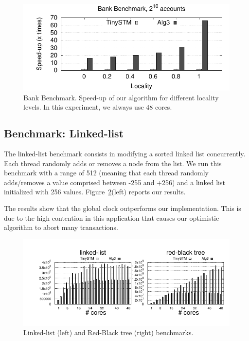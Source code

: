 \begin{figure}[!t]
	\centering
	\includegraphics[scale = 0.8]{results/bank-speedup/bank-speedup.pdf}
	\caption{Bank Benchmark. Speed-up of our algorithm for different locality levels. In this experiment, we always use 48 cores.\label{fig:benchmarking:bank:speedup}}
\end{figure}


\subsection{Benchmark: Linked-list}

The linked-list benchmark consists in modifying a sorted linked list concurrently. 
Each thread randomly adds or removes a node from the list. 
We run this benchmark with a range of 512 (meaning that each thread randomly adds/removes a value comprised between -255 and +256) and a linked list initialized with 256 values.
Figure~\ref{fig:benchmarking:llrb}(left) reports our results.

The results show that the global clock outperforms our implementation. 
This is due to the high contention in this application that causes our optimistic algorithm to abort  many transactions.

\begin{figure}[!t]
	\centering
	\includegraphics[scale = 1.0]{results/intset/ll-rb.pdf}
	\caption{Linked-list (left) and Red-Black tree (right) benchmarks.\label{fig:benchmarking:llrb}}
\end{figure}

